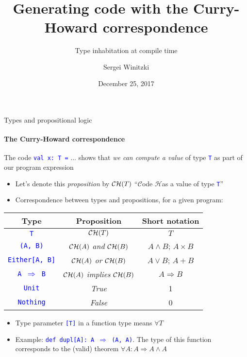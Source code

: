 \documentclass[english]{beamer}
\title[Curry-Howard code generator]{Generating code with the Curry-Howard correspondence}
\subtitle{Type inhabitation at compile time}
\author{Sergei Winitzki}
\date{December 25, 2017}
\institute[ABTB]{Academy by the Bay}
\providecommand{\tabularnewline}{\\}
\begin{document}
\frame{\titlepage}
\begin{frame}{Types and propositional logic}


\framesubtitle{The Curry-Howard correspondence}

The code \texttt{\textcolor{blue}{\footnotesize{}val x:\ T =}} ...
shows that \emph{we can compute a value} of type \texttt{\textcolor{blue}{\footnotesize{}T}}
as part of our program expression
\begin{itemize}
\item Let's denote this \emph{proposition} by ${\cal CH}(T)$ \textendash{}
``$\mathcal{C}$ode $\mathcal{H}$as a value of type \texttt{\textcolor{blue}{\footnotesize{}T}}''
\item Correspondence between types and propositions, for a given program:
\end{itemize}
\begin{center}
\begin{tabular}{|c|c|c|}
\hline 
\textbf{Type} &
\textbf{Proposition} &
\textbf{Short notation}\tabularnewline
\hline 
\hline 
\texttt{\textcolor{blue}{\footnotesize{}T}} &
${\cal CH}(T)$ &
$T$\tabularnewline
\hline 
\texttt{\textcolor{blue}{\footnotesize{}(A, B)}} &
${\cal CH}(A)$ \emph{and} ${\cal CH}(B)$ &
$A\wedge B$; $A\times B$\tabularnewline
\hline 
\texttt{\textcolor{blue}{\footnotesize{}Either{[}A, B{]}}} &
${\cal CH}(A)$ \emph{or} ${\cal CH}(B)$ &
$A\vee B$; $A+B$\tabularnewline
\hline 
\texttt{\textcolor{blue}{\footnotesize{}A $\Rightarrow$ B}} &
${\cal CH}(A)$ \emph{implies} ${\cal CH}(B)$ &
$A\Rightarrow B$\tabularnewline
\hline 
\texttt{\textcolor{blue}{\footnotesize{}Unit}} &
\emph{True} &
1\tabularnewline
\hline 
\texttt{\textcolor{blue}{\footnotesize{}Nothing}} &
\emph{False} &
0\tabularnewline
\hline 
\end{tabular}
\par\end{center}
\begin{itemize}
\item Type parameter \texttt{\textcolor{blue}{\footnotesize{}{[}T{]}}} in
a function type means $\forall T$
\item Example: \texttt{\textcolor{blue}{\footnotesize{}def dupl{[}A{]}:\ A
$\Rightarrow$ (A, A)}}. The type of this function corresponds to
the (valid) theorem $\forall A:A\Rightarrow A\wedge A$
\end{itemize}
\end{frame}
\end{document}
